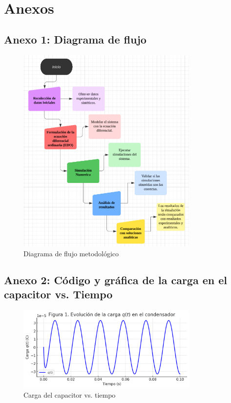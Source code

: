 \section{Anexos}
\vspace*{2cm}

\subsection*{Anexo 1: Diagrama de flujo}
\begin{figure}[H]
	\centering
	\includegraphics[width=0.8\textwidth]{5.png}
	\caption{Diagrama de flujo metodológico}
\end{figure}

\newpage

\subsection*{Anexo 2: Código y gráfica de la carga en el capacitor vs. Tiempo}
\begin{figure}[H]
	\centering
	\includegraphics[width=0.8\textwidth]{7.png}
	\caption{Carga del capacitor vs. tiempo}
\end{figure}

